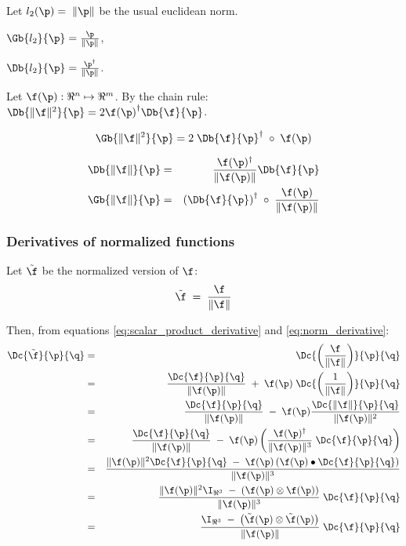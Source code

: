 Let $l_2(\p) = \; \| \p  \|$ be the usual euclidean norm.

$\Gb{l_2}{\p} = {{ \p } \over { \| \p  \|}}$,

$\Db{l_2}{\p} = {{ \p^\dagger } \over { \| \p  \|}}$.

Let $\f(\p) : \Re^n \mapsto \Re^m$.
By the chain rule:
$\Db{\| \f \|^2}{\p}  =  2 {\f(\p)}^{\dagger} \Db{\f}{\p} $.


\begin{equation}
\Gb{\| \f \|^2}{\p}  =  2 \;\Db{\f}{\p}^\dagger \;\circ \;\f(\p)
\end{equation}

\begin{eqnarray}
\label{eq:norm_derivative}
\Db{\| \f \|}{\p}
& = &
{{\f(\p)^\dagger} \over {\| \f(\p) \|}} \Db{\f}{\p}  \\
\Gb{\| \f \|}{\p}
& = &
\left(\Db{\f}{\p}\right)^\dagger \;\circ \;{{\f(\p)} \over { \| \f(\p)  \|}}
\label{eq:norm_gradient}
\end{eqnarray}


\subsubsection{Derivatives of normalized functions}
\label{sec:Derivatives-of-normalized-functions}

Let $\tilde{\f}$ be the normalized version of $\f$:
\begin{equation}
\tilde{\f} \;= \;{{\f} \over {\| \f \|}}
\end{equation}

Then, from equations \ref{eq:scalar_product_derivative}
and \ref{eq:norm_derivative}:
\begin{eqnarray}
\Dc{\tilde{\f}}{\p}{\q}
& = &
\Dc{\left({\f \over {\| \f \|}}\right)}{\p}{\q}
\\
& = &
{\Dc{\f}{\p}{\q} \over {\| \f(\p) \|}}
\; + \;
\f(\p) \; \Dc{\left({1 \over {\| \f \|}}\right)}{\p}{\q} \nonumber \\
& = &
{\Dc{\f}{\p}{\q} \over {\| \f(\p) \|}}
\; - \;
\f(\p) {{\Dc{\| \f \|}{\p}{\q}} \over {\|\f(\p)\|^2}} \nonumber \\
& = &
{\Dc{\f}{\p}{\q} \over {\| \f(\p) \|}}
\; - \;
\f(\p) \left( {{\f(\p)^\dagger} \over {\| \f(\p) \|^3}} \;\Dc{\f}{\p}{\q} \right) \nonumber \\
& = &
{\| \f(\p) \|^2 \Dc{\f}{\p}{\q}
\; - \;
\f(\p)\left( \f(\p) \bullet \Dc{\f}{\p}{\q} \right) }
\over {\| \f(\p) \|^3}  \nonumber \\
& = &
{{\| \f(\p) \|^2 \I_{\Re^3} \;- \;\left( \f(\p) \otimes \f(\p) \right)  }
\over {\| \f(\p) \|^3} }
\;\Dc{\f}{\p}{\q} \nonumber \\
& = &
{{\I_{\Re^3} \;- \;\left( \tilde{\f}(\p) \otimes \tilde{\f}(\p) \right)  }
\over {\| \f(\p) \|} }
\;\Dc{\f}{\p}{\q} \nonumber
\end{eqnarray}

